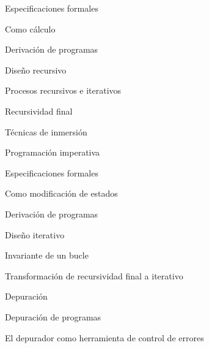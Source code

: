 \begin{longenum}
\begin{longenum}
\begin{longenum}
            \item Especificaciones formales
            \begin{longenum}
                \item Como cálculo
            \end{longenum}
            \item Derivación de programas
            \begin{longenum}
                \item Diseño recursivo
                \begin{longenum}
                    \item Procesos recursivos e iterativos
                    \item Recursividad final
                    \item Técnicas de inmersión
                \end{longenum}
            \end{longenum}
        \end{longenum}
        \item Programación imperativa
        \begin{longenum}
            \item Especificaciones formales
            \begin{longenum}
                \item Como modificación de estados
            \end{longenum}
            \item Derivación de programas
            \begin{longenum}
                \item Diseño iterativo
                \begin{longenum}
                    \item Invariante de un bucle
                    \item Transformación de recursividad final a iterativo
                \end{longenum}
            \end{longenum}
        \end{longenum}
        \item Depuración
        \begin{longenum}
            \item Depuración de programas
            \item El depurador como herramienta de control de errores
        \end{longenum}

\end{longenum}
\end{longenum}
